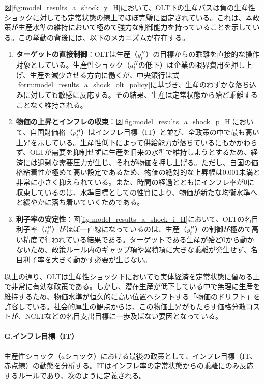 図\ref{fig:model_results_a_shock_y_H}において、OLT下の生産パスは負の生産性ショックに対しても定常状態の線上でほぼ完璧に固定されている。これは、本政策が生産水準の維持において極めて強力な制御能力を持っていることを示している。この挙動の背後には、以下のメカニズムが存在する。

\begin{enumerate}
    \item\label{itm:model_results_a_shock_asad_analysis_olt_control} \textbf{ターゲットの直接制御}：OLTは生産（\(y_t^H\)）の目標からの乖離を直接的な操作対象としている。生産性ショック（\(a_t^H\)の低下）は企業の限界費用を押し上げ、生産を減少させる方向に働くが、中央銀行は式\eqref{form:model_results_a_shock_olt_policy}に基づき、生産のわずかな落ち込みに対しても敏感に反応する。その結果、生産は定常状態から殆ど乖離することなく維持される。
    \item\label{itm:model_results_a_shock_asad_analysis_olt_inflation} \textbf{物価の上昇とインフレの収束}：図\ref{fig:model_results_a_shock_p_H}において、自国財価格（\(p_t^H\)）はインフレ目標（IT）と並び、全政策の中で最も高い上昇を示している。生産性低下によって供給能力が落ちているにもかかわらず、OLTが需要を抑制せずに生産を旧来の水準で維持しようとするため、経済には過剰な需要圧力が生じ、それが物価を押し上げる。ただし、自国の価格粘着性が極めて高い設定であるため、物価の絶対的な上昇幅は0.001未満と非常に小さく抑えられている。また、時間の経過とともにインフレ率が0に収束しているのは、水準目標としての性質により、物価が新たな均衡水準へと緩やかに落ち着いていくためである。
    \item\label{itm:model_results_a_shock_asad_analysis_olt_stability} \textbf{利子率の安定性}：図\ref{fig:model_results_a_shock_i_H}において、OLTの名目利子率（\(i_t^H\)）がほぼ一直線になっているのは、生産（\(y_t^H\)）の制御が極めて高い精度で行われている結果である。ターゲットである生産が殆ど0から動かないため、政策ルール内のギャップ項や累積項に大きな乖離が発生せず、名目利子率を大きく動かす必要が生じない。
\end{enumerate}

以上の通り、OLTは生産性ショック下においても実体経済を定常状態に留める上で非常に有効な政策である。しかし、潜在生産が低下している中で無理に生産を維持するため、物価水準が恒久的に高い位置へシフトする「物価のドリフト」を許容している。社会的厚生の観点からは、この物価上昇がもたらす価格分散コストが、NCLTなどの名目支出目標に一歩及ばない要因となっている。

\paragraph{G.インフレ目標（IT）}\label{sec:model_results_a_shock_asad_analysis_it}
生産性ショック（\(a\)ショック）における最後の政策として、インフレ目標（IT、赤点線）の動態を分析する。ITはインフレ率の定常状態からの乖離にのみ反応するルールであり、次のように定義される。

